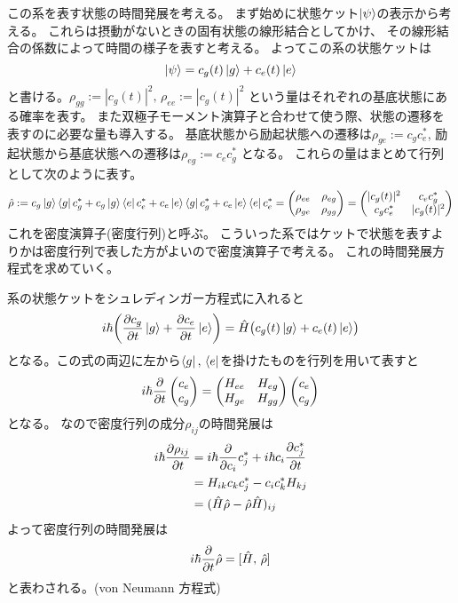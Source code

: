 \documentclass[11pt,dvipdfmx,a4paper]{jsarticle}
\begin{document}
この系を表す状態の時間発展を考える。
まず始めに状態ケット\(\ket{\psi}\)の表示から考える。
これらは摂動がないときの固有状態の線形結合としてかけ、
その線形結合の係数によって時間の様子を表すと考える。
よってこの系の状態ケットは
\begin{equation}
	\ket{\psi} = c_g (t) \ket{g} + c_e (t) \ket{e}
\end{equation}
と書ける。\(\rho_{gg}:=|c_g(t)|^2,\,\rho_{ee}:=|c_g(t)|^2\) という量はそれぞれの基底状態にある確率を表す。
また双極子モーメント演算子と合わせて使う際、状態の遷移を表すのに必要な量も導入する。
基底状態から励起状態への遷移は\(\rho_{ge} := c_g c_e^*\),
励起状態から基底状態への遷移は\(\rho_{eg} := c_e c_g^*\)
となる。
これらの量はまとめて行列として次のように表す。
\begin{equation}
	\hat{\rho} := c_g \ket{g}\bra{g} c_g^*
	+ c_g \ket{g}\bra{e} c_e^*
	+ c_e \ket{e}\bra{g} c_g^*
	+ c_e \ket{e}\bra{e} c_e^*
	=
	\begin{pmatrix}
		\rho_{ee} & \rho_{eg}\\
		\rho_{ge} & \rho_{gg}
	\end{pmatrix}
	=
	\begin{pmatrix}
		|c_g(t)|^2 & c_e c_g^*\\
		c_g c_e^* & |c_g(t)|^2
	\end{pmatrix}
\end{equation}
これを密度演算子(密度行列)と呼ぶ。
こういった系ではケットで状態を表すよりかは密度行列で表した方がよいので密度演算子で考える。
これの時間発展方程式を求めていく。

系の状態ケットをシュレディンガー方程式に入れると
\begin{equation}
	i\hbar\qty(\pdv{c_g}{t}\ket{g}+\pdv{c_e}{t}\ket{e}) = \hat{H}\bigl(c_g (t) \ket{g} + c_e (t) \ket{e}\bigr)
\end{equation}
となる。この式の両辺に左から\(\bra{g},\,\bra{e}\)を掛けたものを行列を用いて表すと
\begin{equation}
	i\hbar\pdv{t}
	\begin{pmatrix}
		c_e\\
		c_g
	\end{pmatrix}
	=
	\begin{pmatrix}
		H_{ee} & H_{eg}\\
		H_{ge} & H_{gg}
	\end{pmatrix}
	\begin{pmatrix}
		c_e\\
		c_g
	\end{pmatrix}
\end{equation}
となる。
なので密度行列の成分\(\rho_{ij}\)の時間発展は
\begin{align}
	i\hbar\pdv{\rho_{ij}}{t} &= i\hbar\pdv{c_i}c_j^*+i\hbar c_i \pdv{c_j^*}{t}\\
	&= H_{ik} c_k c_j^* - c_i c_k^* H_{kj}\\
	&= (\hat{H}\hat{\rho}-\hat{\rho}\hat{H})_{ij}
\end{align}
よって密度行列の時間発展は
\begin{equation}
	i\hbar \pdv{t} \hat{\rho} = [\hat{H},\,\hat{\rho}]
\end{equation}
と表わされる。(von Neumann 方程式)
\end{document}
